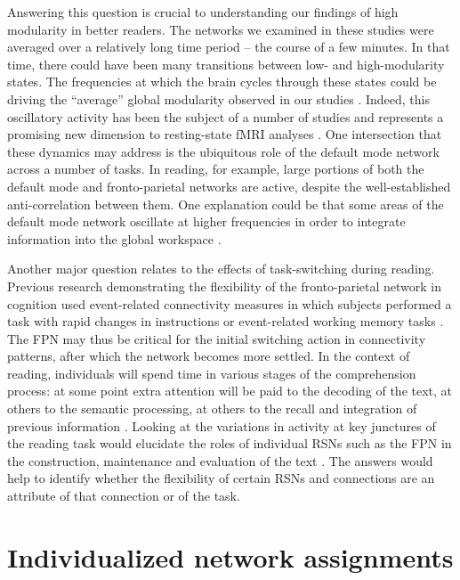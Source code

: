 Answering this question is crucial to understanding our findings of high modularity in better readers. The networks we examined in these studies were averaged over a relatively long time period -- the course of a few minutes. In that time, there could have been many transitions between low- and high-modularity states. The frequencies at which the brain cycles through these states could be driving the ``average'' global modularity observed in our studies \citep{Fries2005}. Indeed, this oscillatory activity has been the subject of a number of studies and represents a promising new dimension to resting-state fMRI analyses \citep{Hutchison2013}. One intersection that these dynamics may address is the ubiquitous role of the default mode network across a number of tasks. In reading, for example, large portions of both the default mode and fronto-parietal networks are active, despite the well-established anti-correlation between them. One explanation could be that some areas of the default mode network oscillate at higher frequencies in order to integrate information into the global workspace \citep{Vatansever2015}.

Another major question relates to the effects of task-switching during reading. Previous research demonstrating the flexibility of the fronto-parietal network in cognition used event-related connectivity measures in which subjects performed a task with rapid changes in instructions or event-related working memory tasks \citep{Cole2013, Braun2015}. The FPN may thus be critical for the initial switching action in connectivity patterns, after which the network becomes more settled. In the context of reading, individuals will spend time in various stages of the comprehension process: at some point extra attention will be paid to the decoding of the text, at others to the semantic processing, at others to the recall and integration of previous information \citep{Spreng2013}. Looking at the variations in activity at key junctures of the reading task would elucidate the roles of individual RSNs such as the FPN in the construction, maintenance and evaluation of the text \citep{Sakai2008}. The answers would help to identify whether the flexibility of certain RSNs and connections are an attribute of that connection or of the task.

\section{Individualized network assignments}

